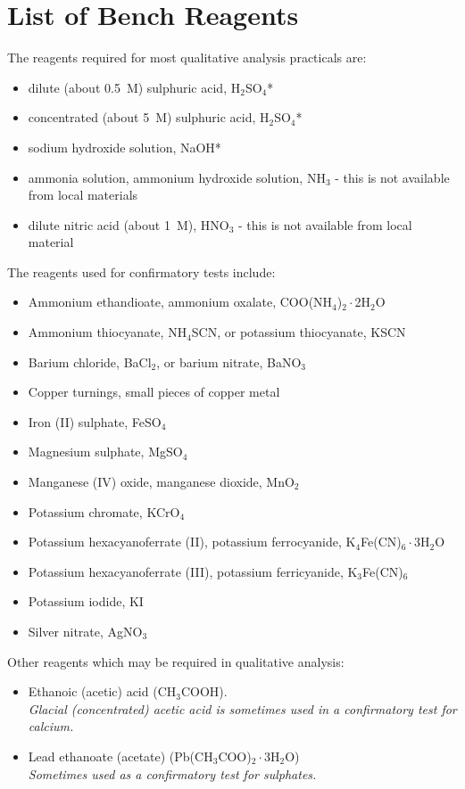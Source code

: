 \section{List of Bench Reagents}

The reagents required for most qualitative analysis practicals are:
\begin{itemize}
\item{dilute (about 0.5~M) sulphuric acid, 
H$_{2}$SO$_{4}$*}
\item{concentrated (about 5~M) sulphuric acid, 
H$_{2}$SO$_{4}$*}
\item{sodium hydroxide solution, 
NaOH*}
\item{ammonia solution, 
ammonium hydroxide solution, 
NH$_{3}$ - this is not available from local materials}
\item{dilute nitric acid (about 1~M), 
HNO$_{3}$ - this is not available from local material}
\end{itemize}

The reagents used for confirmatory tests include:
\begin{itemize}
\item{Ammonium ethandioate, 
ammonium oxalate, 
COO(NH$_{4}$)$_{2} \cdot$2H$_{2}$O}
\item{Ammonium thiocyanate, 
NH$_{4}$SCN, 
or potassium thiocyanate, 
KSCN}
\item{Barium chloride, 
BaCl$_{2}$, 
or barium nitrate, 
BaNO$_{3}$}
\item{Copper turnings, 
small pieces of copper metal}
\item{Iron (II) sulphate, 
FeSO$_{4}$}
\item{Magnesium sulphate, 
MgSO$_{4}$}
\item{Manganese (IV) oxide, 
manganese dioxide, 
MnO$_{2}$}
\item{Potassium chromate, 
KCrO$_{4}$}
\item{Potassium hexacyanoferrate (II), 
potassium ferrocyanide, 
K$_{4}$Fe(CN)$_{6} \cdot$3H$_{2}$O}
\item{Potassium hexacyanoferrate (III), 
potassium ferricyanide, 
K$_{3}$Fe(CN)$_{6}$}
\item{Potassium iodide, 
KI}
\item{Silver nitrate, 
AgNO$_{3}$}
\end{itemize}

Other reagents which may be required in qualitative analysis:
\begin{itemize}
\item{Ethanoic (acetic) acid (CH$_{3}$COOH).}\\
\textit{Glacial (concentrated) acetic acid 
is sometimes used in a confirmatory test for calcium.}
\item{Lead ethanoate (acetate) (Pb(CH$_{3}$COO)$_{2} \cdot$3H$_{2}$O)}\\
\textit{Sometimes used as a confirmatory test for sulphates.}
\end{itemize}

